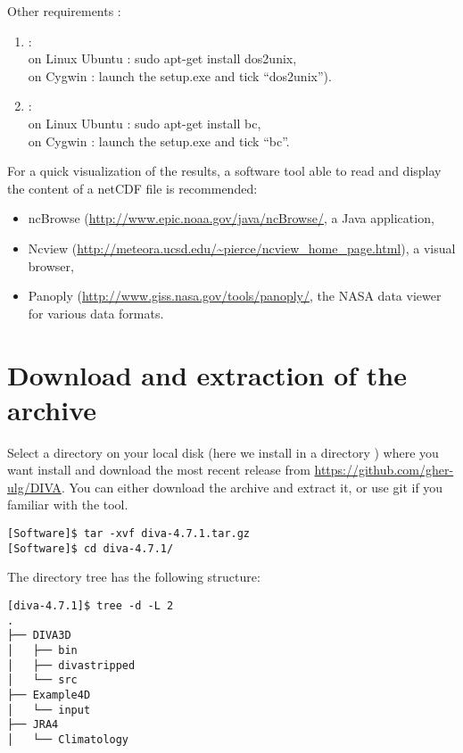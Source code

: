 Other requirements :
\begin{enumerate}
 \item {}:\\
 on Linux Ubuntu : sudo apt-get install dos2unix, \\
 on Cygwin : launch the setup.exe and tick ``dos2unix'').
 \item {}:\\
 on Linux Ubuntu : sudo apt-get install bc,\\
  on Cygwin : launch the setup.exe and tick ``bc''.
\end{enumerate}



For a quick visualization of the results, a software tool able to read and display the content of a netCDF  file is recommended:
\begin{itemize}
\item ncBrowse (\url{http://www.epic.noaa.gov/java/ncBrowse/}, a Java application,
\item Ncview (\url{http://meteora.ucsd.edu/~pierce/ncview_home_page.html}), a visual browser, 
\item Panoply (\url{http://www.giss.nasa.gov/tools/panoply/}, the NASA data viewer for various data formats.
\end{itemize}


\section{Download and extraction of the archive}
Select a directory on your local disk (here we install in a directory ) where you want install \diva and download the most recent release from \url{https://github.com/gher-ulg/DIVA}. You can either download the archive and extract it, or use git if you familiar with the tool.

\begin{lstlisting}[style=Bash]
[Software]$ tar -xvf diva-4.7.1.tar.gz
[Software]$ cd diva-4.7.1/
\end{lstlisting}

The directory tree has the following structure: %
\begin{lstlisting}[style=Bash]
[diva-4.7.1]$ tree -d -L 2
.
├── DIVA3D
│   ├── bin
│   ├── divastripped
│   └── src
├── Example4D
│   └── input
├── JRA4
│   └── Climatology
\end{lstlisting}


